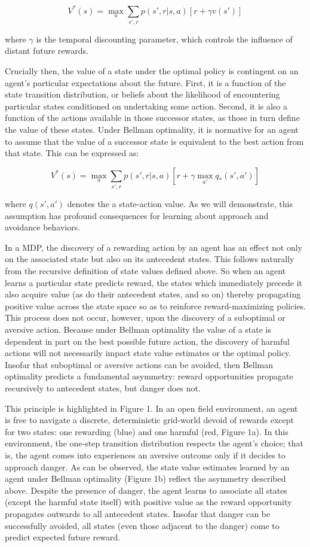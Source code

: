 \documentclass[11pt]{article} %
\begin{document}
$$ V^*(s) = \max_a \sum_{s',r} p(s',r|s,a) \left[ r + \gamma v(s') \right] $$

where $\gamma$ is the temporal discounting parameter, which controls the influence of distant future rewards.

Crucially then, the value of a state under the optimal policy is contingent on an agent's particular expectations about the future. First, it is a function of the state transition distribution, or beliefs about the likelihood of encountering particular states conditioned on undertaking some action. Second, it is also a function of the actions available in those successor states, as those in turn define the value of these states. Under Bellman optimality, it is normative for an agent to assume that the value of a successor state is equivalent to the best action from that state. This can be expressed as:

$$ V^*(s) = \max_a \sum_{s',r}p(s',r|s,a) \left[ r + \gamma \max_{a'} q_*(s',a') \right] $$

where $q(s',a')$ denotes the a state-action value. As we will demonstrate, this assumption has profound consequences for learning about approach and avoidance behaviors.

In a MDP, the discovery of a rewarding action by an agent has an effect not only on the associated state but also on its antecedent states. This follows naturally from the recursive definition of state values defined above. So when an agent learns a particular state predicts reward, the states which immediately precede it also acquire value (as do their antecedent states, and so on) thereby propagating positive value across the state space so as to reinforce reward-maximizing policies. This process does not occur, however, upon the discovery of a suboptimal or aversive action. Because under Bellman optimality the value of a state is dependent in part on the best possible future action, the discovery of harmful actions will not necessarily impact state value estimates or the optimal policy. Insofar that suboptimal or aversive actions can be avoided, then Bellman optimality predicts a fundamental asymmetry: reward opportunities propagate recursively to antecedent states, but danger does not.

This principle is highlighted in Figure 1. In an open field environment, an agent is free to navigate a discrete, deterministic grid-world devoid of rewards except for two states: one rewarding (blue) and one harmful (red, Figure 1a). In this environment, the one-step transition distribution respects the agent's choice; that is, the agent comes into experiences an aversive outcome only if it decides to approach danger. As can be observed, the state value estimates learned by an agent under Bellman optimality (Figure 1b) reflect the asymmetry described above. Despite the presence of danger, the agent learns to associate all states (except the harmful state itself) with positive value as the reward opportunity propagates outwards to all antecedent states. Insofar that danger can be successfully avoided, all states (even those adjacent to the danger) come to predict expected future reward.
\end{document}

